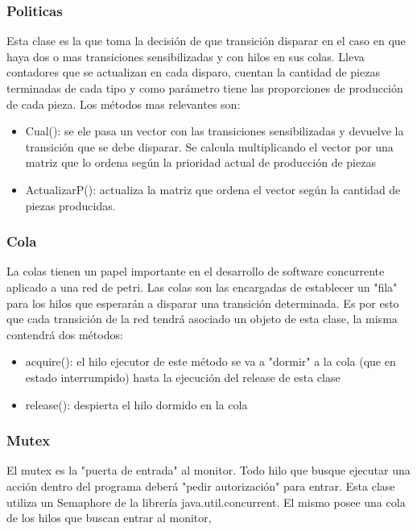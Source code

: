 \documentclass[10pt, a4paper,notitlepage]{article}
\begin{document}
\subsubsection{Politicas}
Esta clase es la que toma la decisión de que transición disparar en el caso en que haya dos o mas transiciones sensibilizadas y con hilos en sus colas. Lleva contadores que se actualizan en cada disparo, cuentan la cantidad de piezas terminadas de cada tipo y como parámetro tiene las proporciones de producción de cada pieza. Los métodos mas relevantes son:
\begin{itemize}
	\item Cual(): se ele pasa un vector con las transiciones sensibilizadas y devuelve la transición que se debe disparar. Se calcula multiplicando el vector por una matriz que lo ordena según la prioridad actual de producción de piezas
	\item ActualizarP(): actualiza la matriz que ordena el vector según la cantidad de piezas producidas.
\end{itemize}
\subsubsection{Cola}
La colas tienen un papel importante en el desarrollo de software concurrente aplicado a una red de petri. Las colas son las encargadas de establecer un "fila" para los hilos que esperarán a disparar una transición determinada.
Es por esto que cada transición de la red tendrá asociado un objeto de esta clase, la misma contendrá dos métodos:
\begin{itemize}
	\item acquire(): el hilo ejecutor de este método se va a "dormir" a la cola (que en estado interrumpido) hasta la ejecución del release de esta clase
	\item release(): despierta el hilo dormido en la cola
\end{itemize}

\subsubsection{Mutex}
El mutex es la "puerta de entrada" al monitor. Todo hilo que busque ejecutar una acción dentro del programa deberá "pedir autorización" para entrar.
Esta clase utiliza un Semaphore de la librería java.util.concurrent. El mismo posee una cola de los hilos que buscan entrar al monitor,
\end{document}
